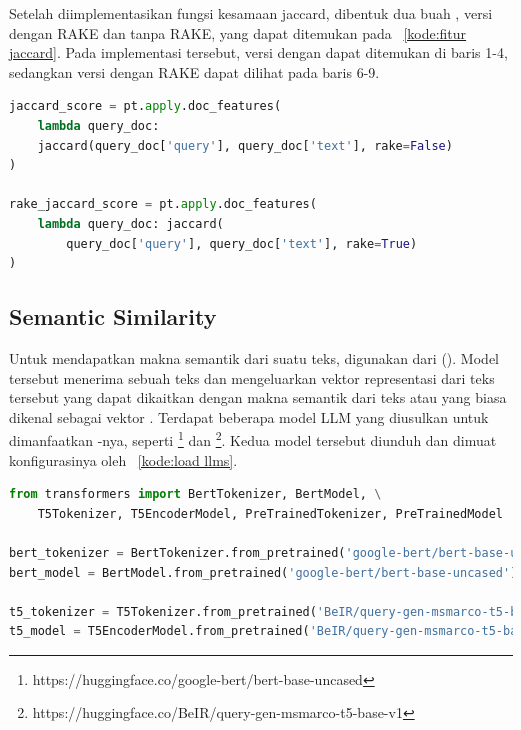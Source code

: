Setelah diimplementasikan fungsi kesamaan jaccard, dibentuk dua buah \pipeline{}, versi dengan RAKE dan tanpa RAKE, yang dapat ditemukan pada \kode{}~\ref{kode:fitur jaccard}. Pada implementasi tersebut, versi \pipeline{} dengan \regex{} dapat ditemukan di baris 1-4, sedangkan versi \pipeline{} dengan RAKE dapat dilihat pada baris 6-9.
\begin{lstlisting}[language=Python, caption={\Pipeline{} ekstraksi fitur jaccard}, label={kode:fitur jaccard}]
jaccard_score = pt.apply.doc_features(
    lambda query_doc:
    jaccard(query_doc['query'], query_doc['text'], rake=False)
)

rake_jaccard_score = pt.apply.doc_features(
    lambda query_doc: jaccard(
        query_doc['query'], query_doc['text'], rake=True)
)
\end{lstlisting}


\subsection{Semantic Similarity}
\label{subbab:4:Ekstraksi Fitur:Semantic Similarity}
Untuk mendapatkan makna semantik dari suatu teks, digunakan \encoder{} dari \llm{} (\LLM{}). Model tersebut menerima sebuah teks dan mengeluarkan vektor representasi dari teks tersebut yang dapat dikaitkan dengan makna semantik dari teks atau yang biasa dikenal sebagai vektor \embedding{}. Terdapat beberapa model LLM yang diusulkan untuk dimanfaatkan \encoder{}-nya, seperti \bert{}\footnote{https://huggingface.co/google-bert/bert-base-uncased} dan \tfive{}\footnote{https://huggingface.co/BeIR/query-gen-msmarco-t5-base-v1}. Kedua model \LLM{} tersebut diunduh dan dimuat konfigurasinya oleh \kode{}~\ref{kode:load llms}.
\begin{lstlisting}[language=Python, caption={\textit{Load} \encoder{} dan model yang sudah dilatih}, label={kode:load llms}]
from transformers import BertTokenizer, BertModel, \
    T5Tokenizer, T5EncoderModel, PreTrainedTokenizer, PreTrainedModel

bert_tokenizer = BertTokenizer.from_pretrained('google-bert/bert-base-uncased')
bert_model = BertModel.from_pretrained('google-bert/bert-base-uncased')

t5_tokenizer = T5Tokenizer.from_pretrained('BeIR/query-gen-msmarco-t5-base-v1')
t5_model = T5EncoderModel.from_pretrained('BeIR/query-gen-msmarco-t5-base-v1')
\end{lstlisting}


